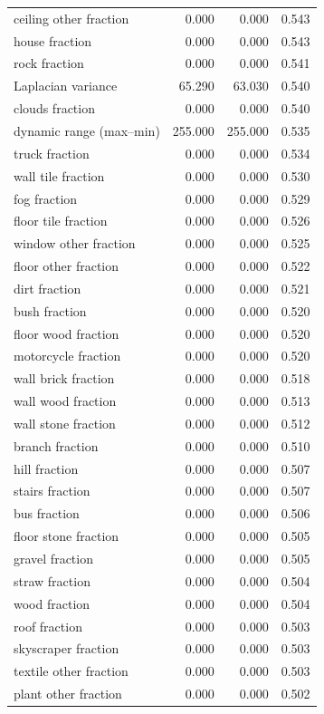 \documentclass[11pt,a4paper]{article}
\begin{document}
\begin{longtable}{lrrr}
ceiling other fraction & 0.000 & 0.000 & 0.543 \\
house fraction & 0.000 & 0.000 & 0.543 \\
rock fraction & 0.000 & 0.000 & 0.541 \\
Laplacian variance & 65.290 & 63.030 & 0.540 \\
clouds fraction & 0.000 & 0.000 & 0.540 \\
dynamic range (max--min) & 255.000 & 255.000 & 0.535 \\
truck fraction & 0.000 & 0.000 & 0.534 \\
wall tile fraction & 0.000 & 0.000 & 0.530 \\
fog fraction & 0.000 & 0.000 & 0.529 \\
floor tile fraction & 0.000 & 0.000 & 0.526 \\
window other fraction & 0.000 & 0.000 & 0.525 \\
floor other fraction & 0.000 & 0.000 & 0.522 \\
dirt fraction & 0.000 & 0.000 & 0.521 \\
bush fraction & 0.000 & 0.000 & 0.520 \\
floor wood fraction & 0.000 & 0.000 & 0.520 \\
motorcycle fraction & 0.000 & 0.000 & 0.520 \\
wall brick fraction & 0.000 & 0.000 & 0.518 \\
wall wood fraction & 0.000 & 0.000 & 0.513 \\
wall stone fraction & 0.000 & 0.000 & 0.512 \\
branch fraction & 0.000 & 0.000 & 0.510 \\
hill fraction & 0.000 & 0.000 & 0.507 \\
stairs fraction & 0.000 & 0.000 & 0.507 \\
bus fraction & 0.000 & 0.000 & 0.506 \\
floor stone fraction & 0.000 & 0.000 & 0.505 \\
gravel fraction & 0.000 & 0.000 & 0.505 \\
straw fraction & 0.000 & 0.000 & 0.504 \\
wood fraction & 0.000 & 0.000 & 0.504 \\
roof fraction & 0.000 & 0.000 & 0.503 \\
skyscraper fraction & 0.000 & 0.000 & 0.503 \\
textile other fraction & 0.000 & 0.000 & 0.503 \\
plant other fraction & 0.000 & 0.000 & 0.502 \\

\end{longtable}
\end{document}
